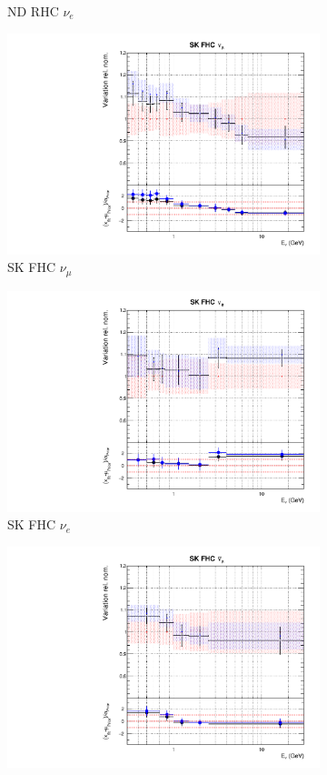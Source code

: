 \begin{figure}
\begin{subfigure}{0.24\textwidth}
  \caption{ND RHC $\nu_e$}
\end{subfigure}
\begin{subfigure}{0.24\textwidth}
  \centering
  \includegraphics[width=0.95\linewidth]{figs/comp5q2vs8q2flux8}
  \caption{SK FHC $\nu_{\mu}$}
\end{subfigure}
\begin{subfigure}{0.24\textwidth}
  \centering
  \includegraphics[width=0.95\linewidth]{figs/comp5q2vs8q2flux9}
  \caption{SK FHC $\nu_e$}
\end{subfigure}
\begin{subfigure}{0.24\textwidth}
  \centering
  \includegraphics[width=0.95\linewidth]{figs/comp5q2vs8q2flux10}

\end{subfigure}
\end{figure}
